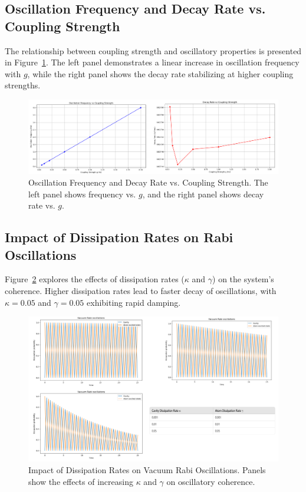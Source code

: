 \documentclass[conference]{IEEEtran}
\begin{document}
\subsection{Oscillation Frequency and Decay Rate vs. Coupling Strength}

The relationship between coupling strength and oscillatory properties is presented in Figure~\ref{fig:frequency_decay}. The left panel demonstrates a linear increase in oscillation frequency with $g$, while the right panel shows the decay rate stabilizing at higher coupling strengths.

\begin{figure}[h!]
    \centering
    \includegraphics[width=0.8\linewidth]{2.png}
    \caption{Oscillation Frequency and Decay Rate vs. Coupling Strength. The left panel shows frequency vs. $g$, and the right panel shows decay rate vs. $g$.}
    \label{fig:frequency_decay}
\end{figure}

\subsection{Impact of Dissipation Rates on Rabi Oscillations}

Figure~\ref{fig:dissipation_rates} explores the effects of dissipation rates ($\kappa$ and $\gamma$) on the system's coherence. Higher dissipation rates lead to faster decay of oscillations, with $\kappa = 0.05$ and $\gamma = 0.05$ exhibiting rapid damping.

\begin{figure}[h!]
    \centering
    \includegraphics[width=0.8\linewidth]{3.png}
    \caption{Impact of Dissipation Rates on Vacuum Rabi Oscillations. Panels show the effects of increasing $\kappa$ and $\gamma$ on oscillatory coherence.}
    \label{fig:dissipation_rates}
\end{figure}
\end{document}
